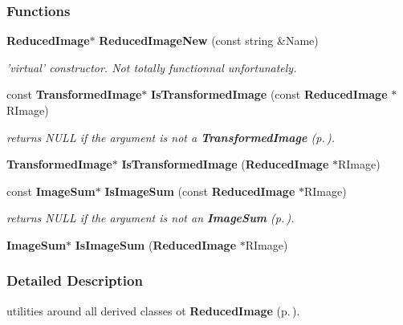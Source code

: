 \subsubsection*{Functions}
\begin{CompactItemize}
\item 
{}
{\bf Reduced\-Image}$\ast$ {\bf Reduced\-Image\-New} (const string \&Name)\label{allreducedimage_h_a0}

\begin{CompactList}\small\item\em 'virtual' constructor. Not totally functionnal unfortunately.\item\end{CompactList}\item 
{}
const {\bf Transformed\-Image}$\ast$ {\bf Is\-Transformed\-Image} (const {\bf Reduced\-Image} $\ast$RImage)\label{allreducedimage_h_a1}

\begin{CompactList}\small\item\em returns NULL if the argument is not a {\bf Transformed\-Image} {\rm (p.\,\pageref{class_transformedimage})}.\item\end{CompactList}\item 
{}
{\bf Transformed\-Image}$\ast$ {\bf Is\-Transformed\-Image} ({\bf Reduced\-Image} $\ast$RImage)\label{allreducedimage_h_a2}

\item 
{}
const {\bf Image\-Sum}$\ast$ {\bf Is\-Image\-Sum} (const {\bf Reduced\-Image} $\ast$RImage)\label{allreducedimage_h_a3}

\begin{CompactList}\small\item\em returns NULL if the argument is not an {\bf Image\-Sum} {\rm (p.\,\pageref{class_imagesum})}.\item\end{CompactList}\item 
{}
{\bf Image\-Sum}$\ast$ {\bf Is\-Image\-Sum} ({\bf Reduced\-Image} $\ast$RImage)\label{allreducedimage_h_a4}

\end{CompactItemize}


\subsubsection{Detailed Description}
utilities around all derived classes ot {\bf Reduced\-Image} {\rm (p.\,\pageref{class_reducedimage})}.



